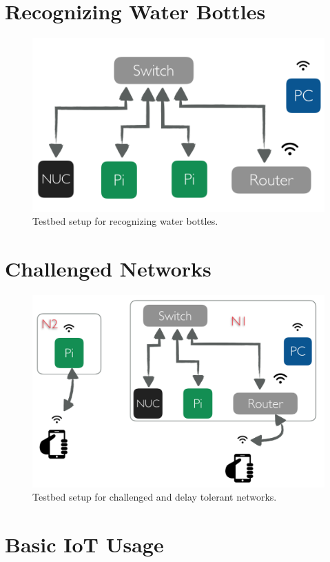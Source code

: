 \section{Recognizing Water Bottles }
 \begin{figure}[H]
	\centering
	\includegraphics[scale=0.6]{images/tb-tensor.png}
	\caption{Testbed setup for recognizing water bottles.}
	\label{fig:tb-tensor}
\end{figure} 

\section{Challenged Networks}
\begin{figure}[H]
	\centering
	\includegraphics[scale=0.6]{images/tb-dtn.png}
	\caption{Testbed setup for challenged and delay tolerant networks.}
	\label{fig:tb-dtn}
\end{figure} 

\section{Basic IoT Usage}